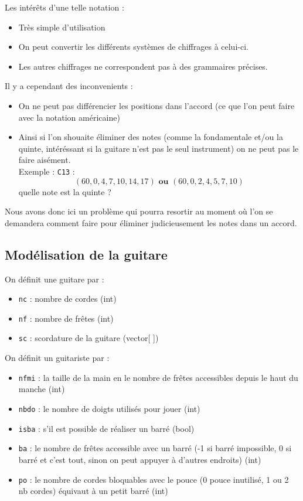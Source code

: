 \begin{rema}
  Les intérêts d'une telle notation :
  \begin{itemize}
    \item Très simple d'utilisation
    \item On peut convertir les différents systèmes de chiffrages à celui-ci.
    \item Les autres chiffrages ne correspondent pas à des grammaires précises.
  \end{itemize}
  Il y a cependant des inconvenients :
  \begin{itemize}
    \item On ne peut pas différencier les positions dans l'accord (ce que l'on
      peut faire avec la notation américaine)
    \item Ainsi si l'on shouaite éliminer des notes (comme la fondamentale et/ou
      la quinte, intéréssant si la guitare n'est pas le seul instrument) on ne
      peut pas le faire aisément.\\
      Exemple : \texttt{C13} :
      $$(60, 0, 4, 7, 10, 14, 17) \textbf{ ou } (60, 0, 2, 4, 5, 7, 10)$$
      quelle note est la quinte ?
  \end{itemize}

  Nous avons donc ici un problème qui pourra resortir au moment où l'on se
  demandera comment faire pour éliminer judicieusement les notes dans un
  accord.
\end{rema}



\subsection{Modélisation de la guitare}

On définit une guitare par :
\begin{itemize}
  \item \texttt{nc} : nombre de cordes (int)
  \item \texttt{nf} : nombre de frêtes (int)
  \item \texttt{sc} : scordature de la guitare (vector[ ])
\end{itemize}

On définit un guitariste par :
\begin{itemize}
  \item \texttt{nfmi} : la taille de la main en le nombre de frêtes accessibles
    depuis le haut du manche (int)
	\item \texttt{nbdo} : le nombre de doigts utilisés pour jouer (int)
	\item \texttt{isba} : s'il est possible de réaliser un barré (bool)
  \item \texttt{ba} : le nombre de frêtes accessible avec un barré (-1 si barré
    impossible, 0 si barré et c'est tout, sinon on peut appuyer à d'autres
    endroits)  (int)
  \item \texttt{po} : le nombre de cordes bloquables avec le pouce (0 pouce
    inutilisé, 1 ou 2 nb cordes) équivaut à un petit barré (int)
\end{itemize}

